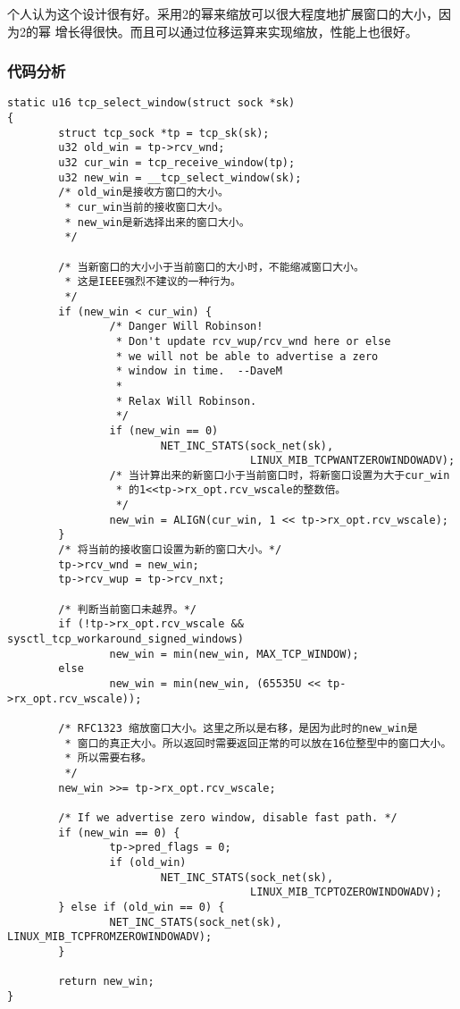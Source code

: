 个人认为这个设计很有好。采用2的幂来缩放可以很大程度地扩展窗口的大小，因为2的幂
增长得很快。而且可以通过位移运算来实现缩放，性能上也很好。

\subsubsection{代码分析}
\begin{verbatim}
static u16 tcp_select_window(struct sock *sk)
{
        struct tcp_sock *tp = tcp_sk(sk);
        u32 old_win = tp->rcv_wnd;
        u32 cur_win = tcp_receive_window(tp);
        u32 new_win = __tcp_select_window(sk);
        /* old_win是接收方窗口的大小。
         * cur_win当前的接收窗口大小。
         * new_win是新选择出来的窗口大小。
         */

        /* 当新窗口的大小小于当前窗口的大小时，不能缩减窗口大小。
         * 这是IEEE强烈不建议的一种行为。
         */
        if (new_win < cur_win) {
                /* Danger Will Robinson!
                 * Don't update rcv_wup/rcv_wnd here or else
                 * we will not be able to advertise a zero
                 * window in time.  --DaveM
                 *
                 * Relax Will Robinson.
                 */
                if (new_win == 0)
                        NET_INC_STATS(sock_net(sk),
                                      LINUX_MIB_TCPWANTZEROWINDOWADV);
                /* 当计算出来的新窗口小于当前窗口时，将新窗口设置为大于cur_win
                 * 的1<<tp->rx_opt.rcv_wscale的整数倍。
                 */
                new_win = ALIGN(cur_win, 1 << tp->rx_opt.rcv_wscale);
        }
        /* 将当前的接收窗口设置为新的窗口大小。*/
        tp->rcv_wnd = new_win;
        tp->rcv_wup = tp->rcv_nxt;

        /* 判断当前窗口未越界。*/
        if (!tp->rx_opt.rcv_wscale && sysctl_tcp_workaround_signed_windows)
                new_win = min(new_win, MAX_TCP_WINDOW);
        else
                new_win = min(new_win, (65535U << tp->rx_opt.rcv_wscale));

        /* RFC1323 缩放窗口大小。这里之所以是右移，是因为此时的new_win是
         * 窗口的真正大小。所以返回时需要返回正常的可以放在16位整型中的窗口大小。
         * 所以需要右移。
         */
        new_win >>= tp->rx_opt.rcv_wscale;

        /* If we advertise zero window, disable fast path. */
        if (new_win == 0) {
                tp->pred_flags = 0;
                if (old_win)
                        NET_INC_STATS(sock_net(sk),
                                      LINUX_MIB_TCPTOZEROWINDOWADV);
        } else if (old_win == 0) {
                NET_INC_STATS(sock_net(sk), LINUX_MIB_TCPFROMZEROWINDOWADV);
        }

        return new_win;
}
\end{verbatim}

